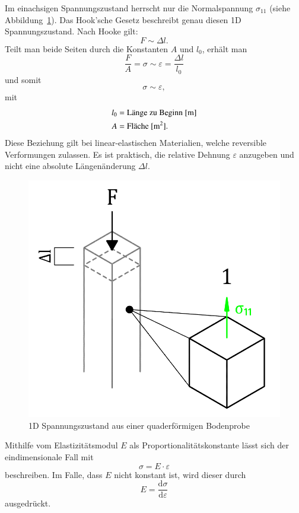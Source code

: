 Im einachsigen Spannungszustand herrscht nur die Normalspannung $\sigma_{11}$ (siehe Abbildung~\ref{fig:Bild1}).
Das Hook'sche Gesetz beschreibt genau diesen 1D Spannungszustand.
Nach Hooke gilt:
\[
F
\sim
\Delta l
.
\]
Teilt man beide Seiten durch die Konstanten $A$ und $l_0$, erhält man
\[
\frac{F}{A}
=
\sigma
\sim
\varepsilon
=
\frac{\Delta l}{l_0}
\]
und somit
\[
\sigma
\sim
\varepsilon
,
\]
mit
\begin{align*}
	l_0 &= \text{Länge zu Beginn [\si{\meter}]} \\
	  A &= \text{Fläche [\si{\meter\squared}].}
\end{align*}
Diese Beziehung gilt bei linear-elastischen Materialien, welche reversible Verformungen zulassen.
Es ist praktisch, die relative Dehnung $\varepsilon$ anzugeben und nicht eine absolute Längenänderung $\Delta l$.
\begin{figure}
	\centering
	\includegraphics[width=0.35\linewidth,keepaspectratio]{papers/spannung/Grafiken/Bild1.png}
	\caption{1D Spannungszustand aus einer quaderförmigen Bodenprobe}
	\label{fig:Bild1}
\end{figure}
Mithilfe vom Elastizitätsmodul $E$ als Proportionalitätskonstante lässt sich der eindimensionale Fall mit
\[
\sigma
=
E\cdot\varepsilon
\]
beschreiben.
Im Falle, dass $E$ nicht konstant ist, wird dieser durch
\[
E
=
\frac{\text{d}\sigma}{\text{d}\varepsilon}
\]
ausgedrückt.